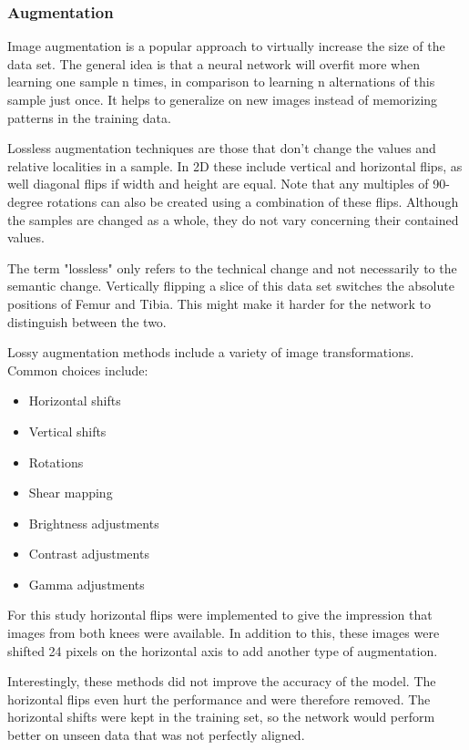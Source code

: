 \subsubsection{Augmentation}

Image augmentation is a popular approach to virtually increase the size of the data set. The general idea is that a neural network will overfit more when learning one sample n times, in comparison to learning n alternations of this sample just once. It helps to generalize on new images instead of memorizing patterns in the training data.

Lossless augmentation techniques are those that don't change the values and relative localities in a sample. In 2D these include vertical and horizontal flips, as well diagonal flips if width and height are equal. Note that any multiples of 90-degree rotations can also be created using a combination of these flips. Although the samples are changed as a whole, they do not vary concerning their contained values. 

The term "lossless" only refers to the technical change and not necessarily to the semantic change. Vertically flipping a slice of this data set switches the absolute positions of Femur and Tibia. This might make it harder for the network to distinguish between the two.

Lossy augmentation methods include a variety of image transformations. Common choices include:

\begin{itemize}
\item Horizontal shifts
\item Vertical shifts
\item Rotations
\item Shear mapping
\item Brightness adjustments
\item Contrast adjustments
\item Gamma adjustments
\end{itemize}

For this study horizontal flips were implemented to give the impression that images from both knees were available. In addition to this, these images were shifted 24 pixels on the horizontal axis to add another type of augmentation. 

Interestingly, these methods did not improve the accuracy of the model. The horizontal flips even hurt the performance and were therefore removed. The horizontal shifts were kept in the training set, so the network would perform better on unseen data that was not perfectly aligned.

